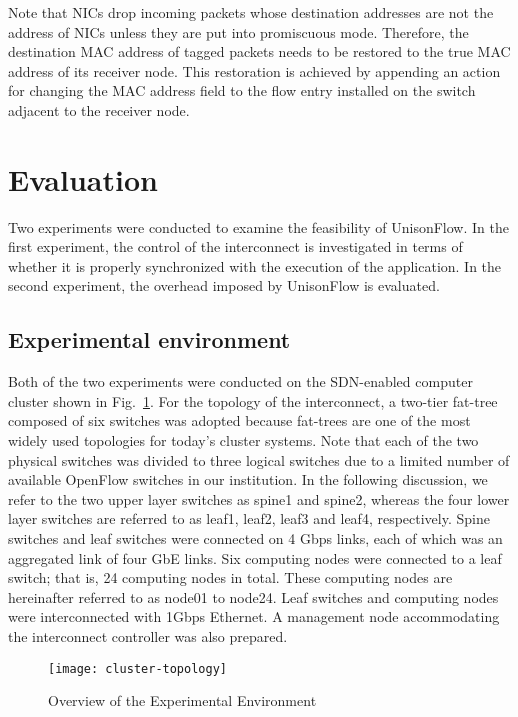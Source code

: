 Note that NICs drop incoming packets whose destination addresses are not
the address of NICs unless they are put into promiscuous mode.
Therefore, the destination MAC address of tagged packets needs to be
restored to the true MAC address of its receiver node. This restoration
is achieved by appending an action for changing the MAC address field to
the flow entry installed on the switch adjacent to the receiver node.

\section{Evaluation}\label{sec:iv-evaluation}

Two experiments were conducted to examine the feasibility of UnisonFlow.
In the first experiment, the control of the interconnect is investigated
in terms of whether it is properly synchronized with the execution of
the application. In the second experiment, the overhead imposed by
UnisonFlow is evaluated.

\subsection{Experimental environment}

Both of the two experiments were conducted on the SDN-enabled computer
cluster shown in Fig.~\ref{fig:cluster-topology}. For the topology of
the interconnect, a two-tier fat-tree composed of six switches was
adopted because fat-trees are one of the most widely used topologies for
today's cluster systems. Note that each of the two physical switches was
divided to three logical switches due to a limited number of available
OpenFlow switches in our institution. In the following discussion, we
refer to the two upper layer switches as spine1 and spine2, whereas the
four lower layer switches are referred to as leaf1, leaf2, leaf3 and
leaf4, respectively. Spine switches and leaf switches were connected on
4 Gbps links, each of which was an aggregated link of four GbE links.
Six computing nodes were connected to a leaf switch; that is, 24
computing nodes in total. These computing nodes are hereinafter referred
to as node01 to node24. Leaf switches and computing nodes were
interconnected with 1Gbps Ethernet. A management node accommodating the
interconnect controller was also prepared.

\begin{figure}
    \centering
    \texttt{[image: cluster-topology]}
    \caption{Overview of the Experimental Environment}%
    \label{fig:cluster-topology}
\end{figure}

